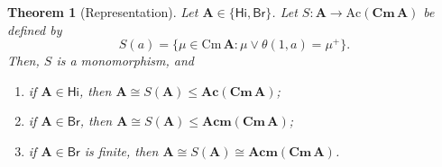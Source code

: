 \documentclass{amsart}
\newtheorem{theorem}{Theorem}[section]
\newcommand{\alg}[1]{\mathbf{#1}}
\newcommand{\var}[1]{\mathsf{#1}}
\newcommand{\Cm}[1]{\mathbf{Cm}\, #1}
\newcommand{\cm}[1]{\mathrm{Cm}\, #1}
\begin{document}
\begin{theorem}[Representation]\label{thm:mono}
Let $\alg{A}\in\{\var{Hi},\var{Br}\}$.  
Let $S\colon\alg{A}\to\mathrm{Ac}(\Cm{\alg{A}})$ be defined by
\begin{equation}\label{eq:S}\tag{\S}
S(a) = \{\mu\in\cm{\alg{A}}:\mu\vee\theta(1,a) = \mu^+\}.
\end{equation}
Then, $S$ is a monomorphism, and 
\begin{enumerate}
\item  if $\alg{A}\in\var{Hi}$, then 
  $\alg{A}\cong S(\alg{A}) \leq \alg{Ac}(\Cm{\alg{A}})$;
\item  if $\alg{A}\in\var{Br}$, then 
  $\alg{A}\cong S(\alg{A}) \leq \alg{Acm}(\Cm{\alg{A}})$;
\item  if $\alg{A}\in\var{Br}$ is finite, then 
  $\alg{A}\cong S(\alg{A}) \cong \alg{Acm}(\Cm{\alg{A}})$.  
\end{enumerate}
\end{theorem}  
\end{document}
